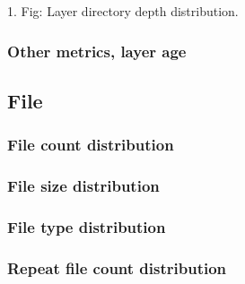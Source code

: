 1. Fig: Layer directory depth distribution.

\subsubsection{Other metrics, layer age}

\subsection{File}

\subsubsection{File count distribution}

\subsubsection{File size distribution}

\subsubsection{File type distribution}

\subsubsection{Repeat file count distribution}